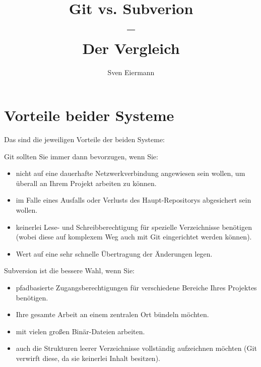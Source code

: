 \documentclass[11pt]{article}
\title{\textbf{Git vs. Subverion \\ -- \\ Der Vergleich }}
\author{Sven Eiermann}
\date{}
\begin{document}
\maketitle

\section{Vorteile beider Systeme}

Das sind die jeweiligen Vorteile der beiden Systeme:

Git sollten Sie immer dann bevorzugen, wenn Sie:

\begin{itemize}

\item    nicht auf eine dauerhafte Netzwerkverbindung angewiesen sein wollen, um überall an Ihrem Projekt arbeiten zu können.
  \item  im Falle eines Ausfalls oder Verlusts des Haupt-Repositorys abgesichert sein wollen.
    \item keinerlei Lese- und Schreibberechtigung für spezielle Verzeichnisse benötigen (wobei diese auf komplexem Weg auch mit Git eingerichtet werden können).
   \item  Wert auf eine sehr schnelle Übertragung der Änderungen legen.
\end{itemize}


Subversion ist die bessere Wahl, wenn Sie:


\begin{itemize}
    \item pfadbasierte Zugangsberechtigungen für verschiedene Bereiche Ihres Projektes benötigen.
    \item Ihre gesamte Arbeit an einem zentralen Ort bündeln möchten.
    \item mit vielen großen Binär-Dateien arbeiten.
    \item auch die Strukturen leerer Verzeichnisse vollständig aufzeichnen möchten (Git verwirft diese, da sie keinerlei Inhalt besitzen).
\end{itemize}
\end{document}
